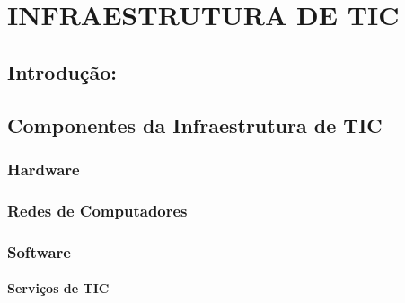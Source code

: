 \documentclass[
]{book}
\begin{document}
\chapter{INFRAESTRUTURA DE TIC}\label{infraestrutura-de-tic}

\section{Introdução:}\label{introduuxe7uxe3o-1}

\section{Componentes da Infraestrutura de TIC}\label{componentes-da-infraestrutura-de-tic}

\subsection{Hardware}\label{hardware}

\subsection{Redes de Computadores}\label{redes-de-computadores}

\subsection{Software}\label{software}

\subsubsection{Serviços de TIC}\label{serviuxe7os-de-tic}
\end{document}
